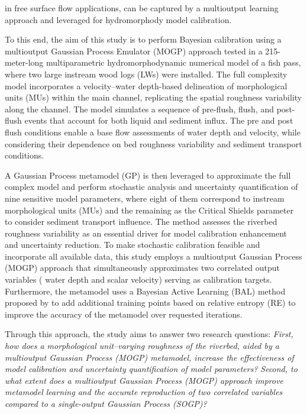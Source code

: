 \documentclass[draft,linenumbers,onecolumn]{agujournal2019} %
\begin{document}
in free surface flow applications, can be captured by a multioutput learning approach and leveraged for hydromorphody model calibration.

% 
To this end, the aim of this study is to perform Bayesian calibration using a multioutput Gaussian Process Emulator (MOGP) approach tested in a 215-meter-long multiparametric hydromorphodynamic numerical model of a fish pass, where two large instream wood logs (LWs) were installed. The full complexity model incorporates a velocity–water depth-based delineation of morphological units (MUs) within the main channel, replicating the spatial roughness variability along the channel. The model simulates a sequence of pre-flush, flush, and post-flush events that account for both liquid and sediment influx. The pre and post flush conditions enable a base flow assessments of water depth and velocity, while considering their dependence on bed roughness variability and sediment transport conditions.

A Gaussian Process metamodel (GP) is then leveraged to approximate the full complex model and perform stochastic analysis and uncertainty quantification of nine sensitive model parameters, where eight of them correspond to instream morphological units (MUs) and the remaining as the Critical Shields parameter to consider sediment transport influence. The method assesses the riverbed roughness variability as an essential driver for model calibration enhancement and uncertainty reduction. To make stochastic calibration feasible and incorporate all available data, this study employs a multioutput Gaussian Process (MOGP) approach that simultaneously approximates two correlated output variables ( water depth and scalar velocity) serving as calibration targets.
Furthermore, the metamodel uses a Bayesian Active Learning (BAL) method proposed by  to add additional training points based on relative entropy (RE) to improve the accuracy of the metamodel over requested iterations. 

Through this approach, the study aims to answer two research questions: \textit{First, how does a morphological unit–varying roughness of the riverbed, aided by a multioutput Gaussian Process (MOGP) metamodel, increase the effectiveness of model calibration and uncertainty quantification of model parameters?} \textit{Second, to what extent does a multioutput Gaussian Process (MOGP) approach improve metamodel learning and the accurate reproduction of two correlated variables compared to a single-output Gaussian Process (SOGP)?}
\end{document}
